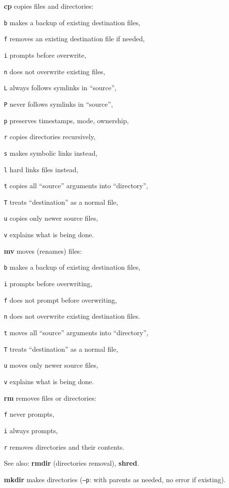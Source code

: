 \begin{compactenum}
	\item [\cmdcore] \textbf{cp} copies files and directories:
	\item [\texttt{b}] makes a backup of existing destination files,
	\item [\texttt{f}] removes an existing destination file if needed,
	\item [\texttt{i}] prompts before overwrite,
	\item [\texttt{n}] does not overwrite existing files,
	\item [\texttt{L}] always follows symlinks in ``source'',
	\item [\texttt{P}] never follows symlinks in ``source'',
	\item [\texttt{p}] preserves timestamps, mode, ownership,
	\item [\texttt{r}] copies directories recursively,
	\item [\texttt{s}] makes symbolic links instead,
	\item [\texttt{l}] hard links files instead,
	\item [\texttt{t}] copies all ``source'' arguments into ``directory'',
	\item [\texttt{T}] treats ``destination'' as a normal file,
	\item [\texttt{u}] copies only newer source files,
	\item [\texttt{v}] explains what is being done.
	
	\item [\cmdcore] \textbf{mv} moves (renames) files:
	\item [\texttt{b}] makes a backup of existing destination files,
	\item [\texttt{i}] prompts before overwriting,
	\item [\texttt{f}] does not prompt before overwriting,
	\item [\texttt{n}] does not overwrite existing destination files.
	\item [\texttt{t}] moves all ``source'' arguments into ``directory'',
	\item [\texttt{T}] treats ``destination'' as a normal file,
	\item [\texttt{u}] moves only newer source files,
	\item [\texttt{v}] explains what is being done.
	
	\item [\cmdcore] \textbf{rm} removes files or directories:
	\item [\texttt{f}] never prompts,
	\item [\texttt{i}] always prompts,
	\item [\texttt{r}] removes directories and their contents.

	\item [\cmdcore] See also: \textbf{rmdir} (directories removal), \textbf{shred}.

	\item [\cmdcore] \textbf{mkdir} makes directories 
	(\texttt{--p}: with parents as needed, no error if existing).
\end{compactenum}


